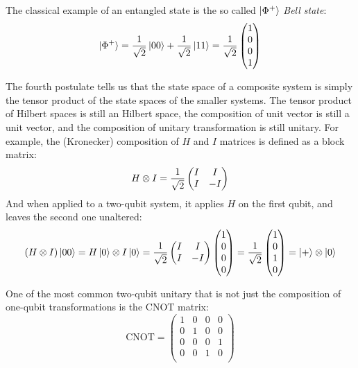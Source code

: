 The classical example of an entangled state is the so called $\ket{\Phi^+}$ \textit{Bell state}:
\[\ket{\Phi^+} = \frac{1}{\sqrt{2}}\ket{00} + \frac{1}{\sqrt{2}}\ket{11} = \frac{1}{\sqrt{2}}\begin{pmatrix}
1 \\ 0 \\ 0\\ 1
\end{pmatrix}
\]

The fourth postulate tells us that the state space of a composite system is simply the tensor product of the state spaces of the smaller systems. The tensor product of Hilbert spaces is still an Hilbert space, the composition of unit vector is still a unit vector, and the composition of unitary transformation is still unitary. For example, the (Kronecker) composition of $H$ and $I$ matrices is defined as a block matrix:
\[	H\otimes I = \frac{1}{\sqrt{2}}\begin{pmatrix}
	I & I \\ I & -I
	\end{pmatrix}\]
And when applied to a two-qubit system, it applies $H$ on the first qubit, and leaves the second one unaltered:
\[ (H\otimes I) \ket{00} = H\ket{0} \otimes I\ket{0} = \frac{1}{\sqrt{2}} \begin{pmatrix}
	I & I \\ I & -I
	\end{pmatrix} \begin{pmatrix}
	1 \\ 0 \\0 \\0
	\end{pmatrix} = \frac{1}{\sqrt{2}} \begin{pmatrix}
	1 \\ 0 \\ 1 \\ 0
	\end{pmatrix} = \ket{+}\otimes\ket{0}
\]

One of the most common two-qubit unitary that is not just the composition of one-qubit transformations is the CNOT matrix:
\[\text{CNOT} = 
\begin{pmatrix}
1 & 0 & 0 & 0 \\
0 & 1 & 0 & 0 \\
0 & 0 & 0 & 1 \\
0 & 0 & 1 & 0 \\
\end{pmatrix}
\]

